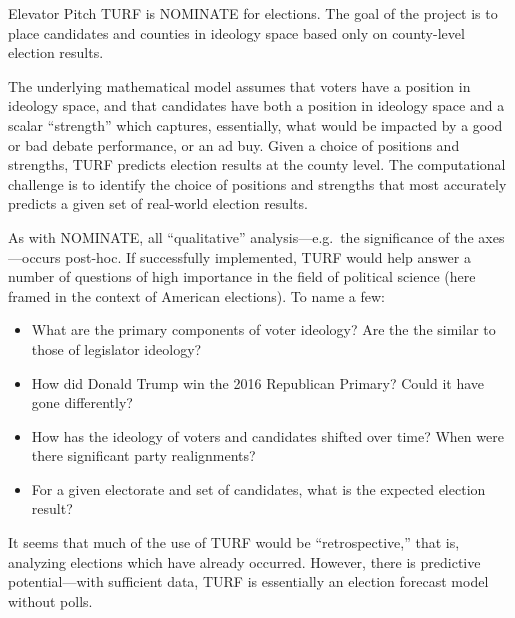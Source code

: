 \documentclass{article}
\newcommand{\noi}{\noindent}
\begin{document}
\begin{section}{Elevator Pitch}
TURF is NOMINATE for elections. The goal of the project is to place candidates and counties in ideology space based only on county-level election results.

The underlying mathematical model assumes that voters have a position in ideology space, and that candidates have both a position in ideology space and a scalar ``strength'' which captures, essentially, what would be impacted by a good or bad debate performance, or an ad buy. Given a choice of positions and strengths, TURF predicts election results at the county level. The computational challenge is to identify the choice of positions and strengths that most accurately predicts a given set of real-world election results.

As with NOMINATE, all ``qualitative'' analysis---e.g.\ the significance of the axes---occurs post-hoc. If successfully implemented, TURF would help answer a number of questions of high importance in the field of political science (here framed in the context of American elections). To name a few:
\begin{itemize}
\item What are the primary components of voter ideology? Are the the similar to those of legislator ideology?
\item How did Donald Trump win the 2016 Republican Primary? Could it have gone differently?
\item How has the ideology of voters and candidates shifted over time? When were there significant party realignments?
\item For a given electorate and set of candidates, what is the expected election result?
\end{itemize}
\noi It seems that much of the use of TURF would be ``retrospective,'' that is, analyzing elections which have already occurred. However, there is predictive potential---with sufficient data, TURF is essentially an election forecast model without polls.
\end{section}
\end{document}
